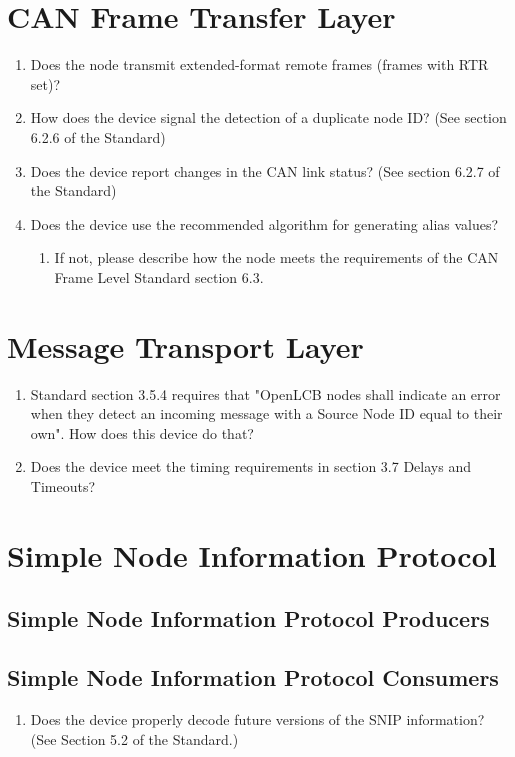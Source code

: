 \section{CAN Frame Transfer Layer}
\begin{enumerate}
    \item Does the node transmit extended-format remote frames (frames with RTR set)?
    \item How does the device signal the detection of a duplicate node ID?
            (See section 6.2.6 of the Standard)
    \item Does the device report changes in the CAN link status? 
            (See section 6.2.7 of the Standard)
    \item Does the device use the recommended algorithm for generating alias values?
        \begin{enumerate}
            \item If not, please describe how the node meets the requirements of the 
                CAN Frame Level Standard section 6.3.
        \end{enumerate}
\end{enumerate}

\section{Message Transport Layer}
\begin{enumerate}
    \item Standard section 3.5.4 requires that "OpenLCB nodes shall indicate an 
        error when they detect an incoming message with a Source Node ID
        equal to their own". How does this device do that?
    \item Does the device meet the timing requirements in section 3.7 Delays and Timeouts?
\end{enumerate}

\section{Simple Node Information Protocol}
\subsection{Simple Node Information Protocol Producers}

\subsection{Simple Node Information Protocol Consumers}
\begin{enumerate}
    \item Does the device properly decode future versions of the SNIP
        information? (See Section 5.2 of the Standard.)
\end{enumerate}

